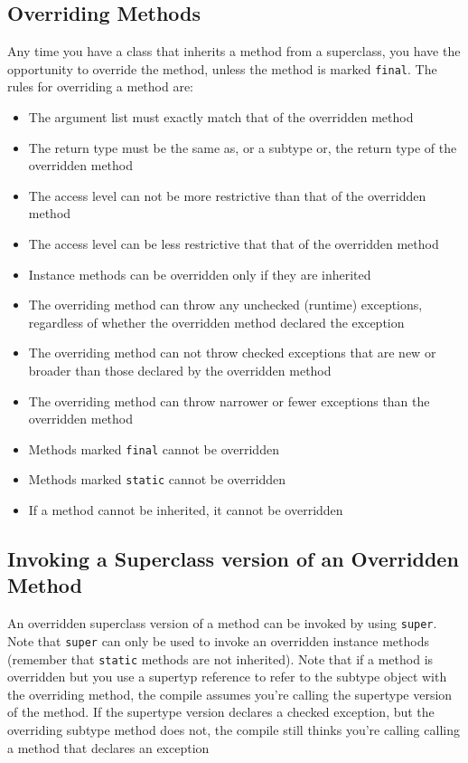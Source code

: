 \subsection{Overriding Methods}
Any time you have a class that inherits a method from a superclass, you have 
the opportunity to override the method, unless the method is marked 
\verb#final#. The rules for overriding a method are:
\begin{itemize}
    \item The argument list must exactly match that of the overridden method
    \item The return type must be the same as, or a subtype or, the return type 
    of the overridden method
    \item The access level can not be more restrictive than that of the 
    overridden method
    \item The access level can be less restrictive that that of the overridden 
    method
    \item Instance methods can be overridden only if they are inherited
    \item The overriding method can throw any unchecked (runtime) exceptions, 
    regardless of whether the overridden method declared the exception
    \item The overriding method can not throw checked exceptions that are new 
    or broader than those declared by the overridden method
    \item The overriding method can throw narrower or fewer exceptions than the 
    overridden method
    \item Methods marked \verb#final# cannot be overridden
    \item Methods marked \verb#static# cannot be overridden
    \item If a method cannot be inherited, it cannot be overridden
\end{itemize}

\subsection{Invoking a Superclass version of an Overridden Method}
An overridden superclass version of a method can be invoked by using 
\verb#super#. Note that \verb#super# can only be used to invoke an overridden 
instance methods (remember that \verb#static# methods are not inherited). Note 
that if a method is overridden but you use a supertyp reference to refer to the 
subtype object with the overriding method, the compile assumes you're calling 
the supertype version of the method. If the supertype version declares a 
checked exception, but the overriding subtype method does not, the compile 
still thinks you're calling calling a method that declares an exception

